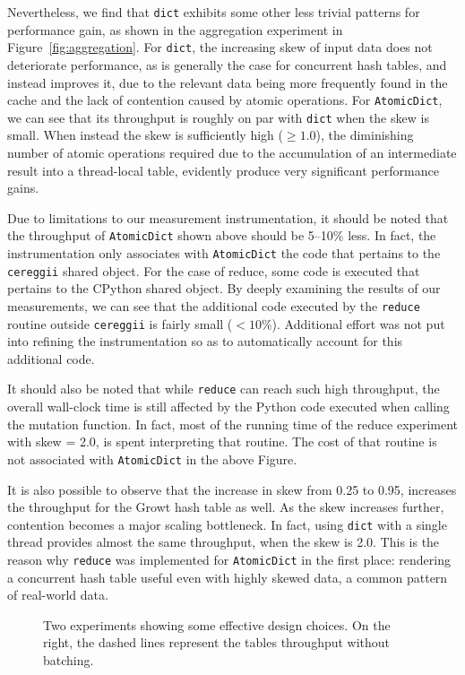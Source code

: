 Nevertheless, we find that \texttt{dict} exhibits some other less trivial patterns for performance gain, as shown in the aggregation experiment in Figure~\ref{fig:aggregation}.
For \texttt{dict}, the increasing skew of input data does not deteriorate performance, as is generally the case for concurrent hash tables, and instead improves it, due to the relevant data being more frequently found in the cache and the lack of contention caused by atomic operations.
For \texttt{AtomicDict}, we can see that its throughput is roughly on par with \texttt{dict} when the skew is small.
When instead the skew is sufficiently high ($\geq 1.0$), the diminishing number of atomic operations required due to the accumulation of an intermediate result into a thread-local table, evidently produce very significant performance gains.

Due to limitations to our measurement instrumentation, it should be noted that the throughput of \texttt{AtomicDict} shown above should be 5--10\% less.
In fact, the instrumentation only associates with \texttt{AtomicDict} the code that pertains to the \texttt{cereggii} shared object.
For the case of reduce, some code is executed that pertains to the CPython shared object.
By deeply examining the results of our measurements, we can see that the additional code executed by the \texttt{reduce} routine outside \texttt{cereggii} is fairly small ($< 10\%$).
Additional effort was not put into refining the instrumentation so as to automatically account for this additional code.

It should also be noted that while \texttt{reduce} can reach such high throughput, the overall wall-clock time is still affected by the Python code executed when calling the mutation function.
In fact, most of the running time of the reduce experiment with skew = 2.0, is spent interpreting that routine.
The cost of that routine is not associated with \texttt{AtomicDict} in the above Figure.

It is also possible to observe that the increase in skew from 0.25 to 0.95, increases the throughput for the Growt hash table as well.
As the skew increases further, contention becomes a major scaling bottleneck.
In fact, using \texttt{dict} with a single thread provides almost the same throughput, when the skew is 2.0.
This is the reason why \texttt{reduce} was implemented for \texttt{AtomicDict} in the first place: rendering a concurrent hash table useful even with highly skewed data, a common pattern of real-world data.

\begin{figure}
    \begin{centering}
        \scalebox{0.4}{}%
        \scalebox{0.4}{}
        \caption{Two experiments showing some effective design choices. On the right, the dashed lines represent the tables throughput without batching.}
        \label{fig:prepotenza}
    \end{centering}
\end{figure}

